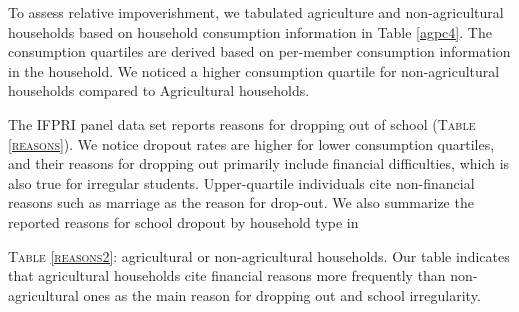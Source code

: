 \documentclass[12pt,letterpaper]{article}
\newcommand{\0}{\ensuremath{\mbox{\boldmath $0$}}}
\begin{document}
\pagebreak


To assess relative impoverishment, we tabulated agriculture and non-agricultural households based on household consumption information in Table \ref{agpc4}. The consumption quartiles are derived based on per-member consumption information in the household. We noticed a higher consumption quartile for non-agricultural households compared to Agricultural households.

The IFPRI panel data set reports reasons for dropping out of school (\textsc{\small Table \ref{reasons}}). We notice dropout rates are higher for lower consumption quartiles, and their reasons for dropping out primarily include financial difficulties, which is also true for irregular students. Upper-quartile individuals cite non-financial reasons such as marriage as the reason for drop-out. We also summarize the reported reasons for school dropout by household type in {\textsc{\small Table \ref{reasons2}}: agricultural or non-agricultural households. Our table indicates that agricultural households cite financial reasons more frequently than non-agricultural ones as the main reason for dropping out and school irregularity. 

\begin{table}
\caption{Tabulation of Agricultural vs. Non-Agriculture household Consumption Quartiles}
\label{agpc4}
\begin{center}
{
}
\end{center}
\end{table}

}
\end{document}
